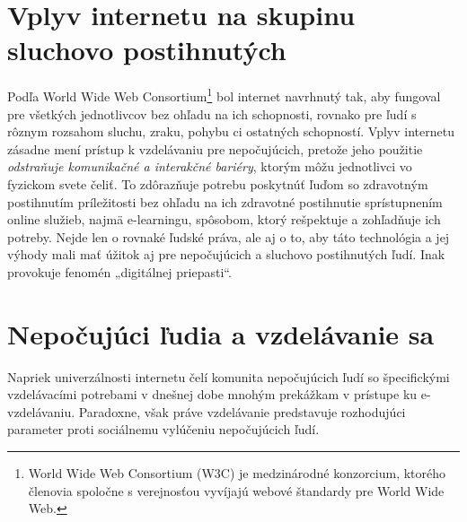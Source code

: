 \documentclass[10pt,oneside,slovak,a4paper]{article}
\begin{document}
\section{Vplyv internetu na skupinu sluchovo postihnutých} \label{vplyv}

Podľa World Wide Web Consortium\footnote{World Wide Web Consortium (W3C) je medzinárodné konzorcium, ktorého členovia spoločne s verejnosťou vyvíjajú webové štandardy pre World Wide Web\cite{WWWC}.} bol internet navrhnutý tak, aby fungoval pre všetkých jednotlivcov bez ohľadu na ich schopnosti, rovnako pre ľudí  s rôznym rozsahom sluchu, zraku, pohybu ci ostatných  schopností. Vplyv internetu zásadne mení prístup k vzdelávaniu pre nepočujúcich, pretože jeho použitie \emph{odstraňuje komunikačné a interakčné bariéry}, ktorým môžu jednotlivci vo fyzickom svete čeliť. To zdôrazňuje potrebu poskytnúť ľuďom so zdravotným postihnutím príležitosti bez ohľadu na ich zdravotné postihnutie sprístupnením online služieb, najmä e-learningu, spôsobom, ktorý rešpektuje a zohľadňuje ich potreby. Nejde len o rovnaké ľudské práva, ale aj o to, aby táto technológia a jej výhody mali mať úžitok aj pre nepočujúcich a sluchovo postihnutých ľudí. Inak provokuje fenomén „digitálnej priepasti“\cite{pappas2018learning}.

\section{Nepočujúci ľudia a vzdelávanie sa} \label{vzdelanie}
Napriek univerzálnosti internetu čelí komunita nepočujúcich ľudí so špecifickými vzdelávacími potrebami v dnešnej dobe mnohým prekážkam v prístupe ku e-vzdelávaniu. Paradoxne,  však práve vzdelávanie predstavuje rozhodujúci parameter proti sociálnemu vylúčeniu nepočujúcich ľudí. 
\end{document}
